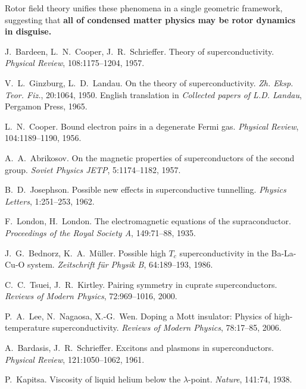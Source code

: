 \documentclass[12pt,a4paper]{article}
\theoremstyle{definition}
\theoremstyle{remark}
\begin{document}
Rotor field theory unifies these phenomena in a single geometric framework, suggesting that \textbf{all of condensed matter physics may be rotor dynamics in disguise.}

\begin{thebibliography}{99}

J.~Bardeen, L.~N.~Cooper, J.~R.~Schrieffer.
\newblock Theory of superconductivity.
\newblock \emph{Physical Review}, 108:1175--1204, 1957.

V.~L.~Ginzburg, L.~D.~Landau.
\newblock On the theory of superconductivity.
\newblock \emph{Zh. Eksp. Teor. Fiz.}, 20:1064, 1950. English translation in \emph{Collected papers of L.D. Landau}, Pergamon Press, 1965.

L.~N.~Cooper.
\newblock Bound electron pairs in a degenerate Fermi gas.
\newblock \emph{Physical Review}, 104:1189--1190, 1956.

A.~A.~Abrikosov.
\newblock On the magnetic properties of superconductors of the second group.
\newblock \emph{Soviet Physics JETP}, 5:1174--1182, 1957.

B.~D.~Josephson.
\newblock Possible new effects in superconductive tunnelling.
\newblock \emph{Physics Letters}, 1:251--253, 1962.

F.~London, H.~London.
\newblock The electromagnetic equations of the supraconductor.
\newblock \emph{Proceedings of the Royal Society A}, 149:71--88, 1935.

J.~G.~Bednorz, K.~A.~Müller.
\newblock Possible high $T_c$ superconductivity in the Ba-La-Cu-O system.
\newblock \emph{Zeitschrift für Physik B}, 64:189--193, 1986.

C.~C.~Tsuei, J.~R.~Kirtley.
\newblock Pairing symmetry in cuprate superconductors.
\newblock \emph{Reviews of Modern Physics}, 72:969--1016, 2000.

P.~A.~Lee, N.~Nagaosa, X.-G.~Wen.
\newblock Doping a Mott insulator: Physics of high-temperature superconductivity.
\newblock \emph{Reviews of Modern Physics}, 78:17--85, 2006.

A.~Bardasis, J.~R.~Schrieffer.
\newblock Excitons and plasmons in superconductors.
\newblock \emph{Physical Review}, 121:1050--1062, 1961.

P.~Kapitsa.
\newblock Viscosity of liquid helium below the $\lambda$-point.
\newblock \emph{Nature}, 141:74, 1938.


\end{thebibliography}
\end{document}
